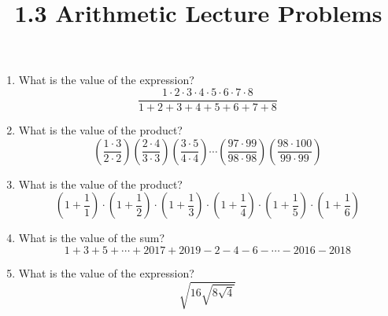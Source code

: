 \documentclass{article}
\title{1.3 Arithmetic Lecture Problems}
\author{}
\date{}
\begin{document}
\maketitle

\begin{enumerate}
    \item What is the value of the expression?
        \[ \frac{1 \cdot 2 \cdot 3 \cdot 4 \cdot 5 \cdot 6 \cdot 7 \cdot 8}{1 + 2 + 3+ 4 + 5 + 6 + 7 + 8} \]
        \vspace{3cm}
    \item What is the value of the product?
        \[ \left(\frac{1 \cdot 3}{2 \cdot 2}\right) \left(\frac{2 \cdot 4}{3 \cdot 3}\right) \left(\frac{3 \cdot 5}{4 \cdot 4}\right) \cdots \left(\frac{97 \cdot 99}{98 \cdot 98}\right) \left(\frac{98 \cdot 100}{99 \cdot 99}\right) \]
        \vspace{3cm}
    \item What is the value of the product?
        \[ \left( 1 + \frac{1}{1}\right) \cdot \left( 1 + \frac{1}{2}\right) \cdot \left( 1 + \frac{1}{3}\right) \cdot \left( 1 + \frac{1}{4}\right) \cdot \left( 1 + \frac{1}{5}\right) \cdot \left( 1 + \frac{1}{6}\right) \]
        \vspace{3cm}
    \item What is the value of the sum?
        \[ 1 + 3 + 5 + \cdots + 2017 + 2019 - 2 - 4 - 6 - \cdots - 2016 - 2018 \]
        \vspace{3cm}
    \item What is the value of the expression?
        \[ \sqrt{16 \sqrt{8 \sqrt{4}}} \]
        \vspace{3cm}
\end{enumerate}
\end{document}
